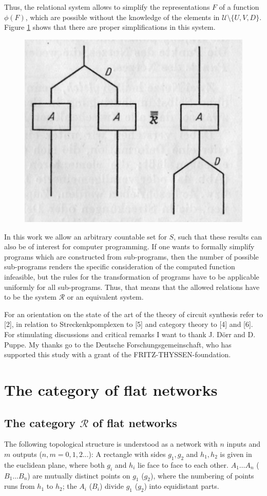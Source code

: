 \documentclass{article}
\begin{document}
Thus, the relational system allows to simplify the representations $F$ of a function $\phi(F)$, which are possible without the knowledge of the elements in $\mathcal{U} \setminus \{ U, V, D \}$. Figure \ref{fig:figure2} shows that there are proper simplifications in this system.

\begin{figure}
\includegraphics[]{figure2.png}
\label{fig:figure2}
\caption{}
\end{figure}

In this work we allow an arbitrary countable set for $S$, such that these results can also be of interest for computer programming. If one wants to formally simplify programs which are constructed from sub-programs, then the number of possible sub-programs renders the specific consideration of the computed function infeasible, but the rules for the transformation of programs have to be applicable uniformly for all sub-programs. Thus, that means that the allowed relations have to be the system
$\mathcal{R}$ or an equivalent system.

For an orientation on the state of the art of the theory of circuit synthesis refer to [2], in relation to Streckenkpomplexen to [5] and category theory to [4] and [6].
For stimulating discussions and critical remarks I want to thank J. D\"{o}rr and D. Puppe. My thanks go to the Deutsche Forschungsgemeinschaft, who has supported this study with a grant of the FRITZ-THYSSEN-foundation.

\section{The category of flat networks }
\subsection{The category $\mathcal{R}$ of flat networks}
The following topological structure is understood as a network with $n$ inputs and $m$ outputs ($n, m = 0, 1, 2...$):
A rectangle with sides $g_1, g_2$ and $h_1, h_2$ is given in the euclidean plane, where both $g_i$ and $h_i$ lie face to face to each other. $A_1 \ldots A_n$ ($B_1 \ldots B_n$) are mutually distinct points on $g_1$ ($g_2$), where the numbering of points runs from $h_1$ to $h_2$; the $A_i$ ($B_i$) divide $g_1$ ($g_2$) into equidistant parts. 
\end{document}

